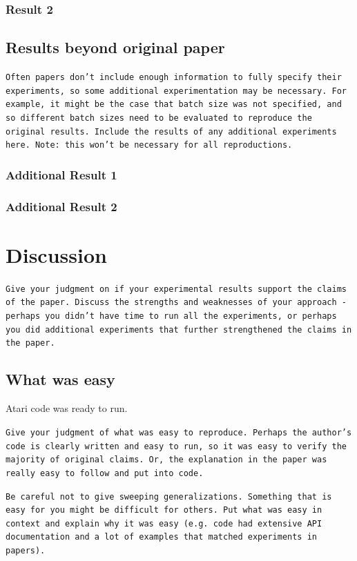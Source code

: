 \documentclass[10pt]{article} %
\begin{document}
\subsubsection{Result 2}

\subsection{Results beyond original paper}
\texttt{Often papers don't include enough information to fully specify their experiments, so some additional experimentation may be necessary. For example, it might be the case that batch size was not specified, and so different batch sizes need to be evaluated to reproduce the original results. Include the results of any additional experiments here. Note: this won't be necessary for all reproductions.}
 
\subsubsection{Additional Result 1}
\subsubsection{Additional Result 2}

\section{Discussion}

\texttt{Give your judgment on if your experimental results support the claims of the paper. Discuss the strengths and weaknesses of your approach - perhaps you didn't have time to run all the experiments, or perhaps you did additional experiments that further strengthened the claims in the paper.}

\subsection{What was easy}
Atari code was ready to run. 

\texttt{Give your judgment of what was easy to reproduce. Perhaps the author's code is clearly written and easy to run, so it was easy to verify the majority of original claims. Or, the explanation in the paper was really easy to follow and put into code.}

\texttt{Be careful not to give sweeping generalizations. Something that is easy for you might be difficult for others. Put what was easy in context and explain why it was easy (e.g. code had extensive API documentation and a lot of examples that matched experiments in papers).}
\end{document}
